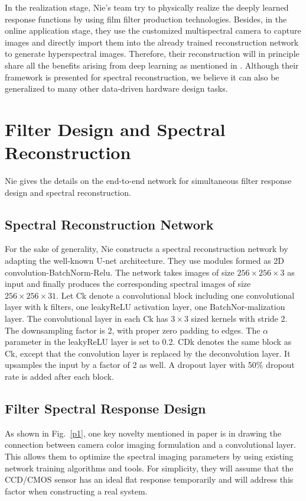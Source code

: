 \documentclass[10pt,twocolumn,letterpaper]{article}
\begin{document}
In the realization stage, Nie's team try to physically realize the deeply learned response functions by using film filter production technologies. Besides, in the online application stage, they use the customized multispectral camera to capture images and directly import them into the already trained reconstruction network to generate hyperspectral images. Therefore, their reconstruction will in principle share all the benefits arising from deep learning as mentioned in \cite{Galliani2017Learned}. Although their framework is presented for spectral reconstruction, we believe it can also be generalized to many other data-driven hardware design tasks.

\section{Filter Design and Spectral Reconstruction}

Nie gives the details on the end-to-end network for simultaneous filter response design and spectral reconstruction. 

\subsection{Spectral Reconstruction Network}

For the sake of generality, Nie constructs a spectral reconstruction network by adapting the well-known U-net architecture. They use modules formed as 2D convolution-BatchNorm-Relu. The network takes images of size $256\times 256\times 3$ as input and finally produces the corresponding spectral images of size $256\times 256\times 31$. Let Ck denote a convolutional block including one convolutional layer with k filters, one leakyReLU activation layer, one BatchNor-malization layer. The convolutional layer in each Ck has $3\times 3$ sized kernels with stride 2. The downsampling factor is 2, with proper zero padding to edges. The $\alpha$ parameter in the leakyReLU layer is set to 0.2. CDk denotes the same block as Ck, except that the convolution layer is replaced by the deconvolution layer. It upsamples the input by a factor of 2 as well. A dropout layer with 50\% dropout rate is added after each block.

\subsection{Filter Spectral Response Design}

As shown in Fig.~\ref{p1}, one key novelty mentioned in paper is in drawing the connection between camera color imaging formulation and a convolutional layer. This allows them to optimize the spectral imaging parameters by using existing network training algorithms and tools. For simplicity, they will assume that the CCD/CMOS sensor has an ideal flat response temporarily and will address this factor when constructing a real system.
\end{document}
